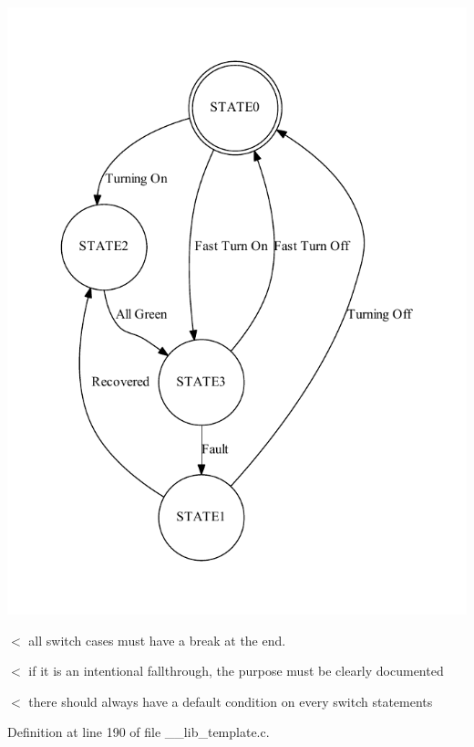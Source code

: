 \begin{center}

\begin{DoxyImageNoCaption}
  \mbox{\includegraphics[width=\textwidth]{dot_inline_dotgraph_2}}
\end{DoxyImageNoCaption}
\end{center}


$<$ all switch cases must have a break at the end.

$<$ if it is an intentional fallthrough, the purpose must be clearly documented

$<$ there should always have a default condition on every switch statements 

Definition at line 190 of file \-\_\-\-\_\-lib\-\_\-template.\-c.

